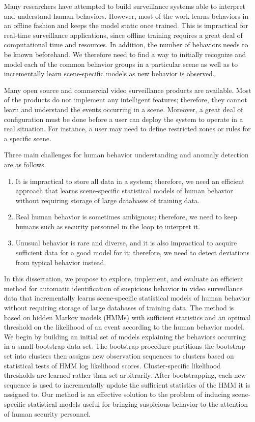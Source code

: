 Many researchers have attempted to build surveillance systems able to
interpret and understand human behaviors. However, most of the work
learns behaviors in an offline fashion and keeps the model static once
trained. This is impractical for real-time surveillance applications,
since offline training requires a great deal of computational time and
resources. In addition, the number of behaviors needs to be known
beforehand. We therefore need to find a way to initially recognize and
model each of the common behavior groups in a particular scene as well
as to incrementally learn scene-specific models as new behavior is
observed.

Many open source and commercial video surveillance products are 
available. Most of the products do not implement any intelligent
features; therefore, they cannot learn and understand the events
occurring in a scene. Moreover, a great deal of configuration must be done
before a user can deploy the system to operate in a real situation.
For instance, a user may need to define restricted zones or rules
for a specific scene.

Three main challenges for human behavior understanding and anomaly
detection are as follows.

\begin{enumerate}
    \item It is impractical to store all data in a system; therefore, we
        need an efficient approach that learns scene-specific statistical
        models of human behavior without requiring storage of large
        databases of training data.
    \item Real human behavior is sometimes ambiguous; therefore, we need to 
        keep humans such as security personnel in the loop to interpret it.
    \item Unusual behavior is rare and diverse, and it is also impractical 
        to acquire sufficient data for a good model for it; therefore, we 
        need to detect deviations from typical behavior instead.
\end{enumerate}

In this dissertation, we propose to explore, implement, and evaluate
an efficient method for automatic identification of suspicious
behavior in video surveillance data that incrementally learns
scene-specific statistical models of human behavior without requiring
storage of large databases of training data. The method is based on
hidden Markov models (HMMs) with sufficient statistics and an optimal
threshold on the likelihood of an event according to the human
behavior model.  We begin by building an initial set of models
explaining the behaviors occurring in a small bootstrap data set. The
bootstrap procedure partitions the bootstrap set into clusters then
assigns new observation sequences to clusters based on statistical
tests of HMM log likelihood scores. Cluster-specific likelihood
thresholds are learned rather than set arbitrarily. After
bootstrapping, each new sequence is used to incrementally update the
sufficient statistics of the HMM it is assigned to. Our method is an
effective solution to the problem of inducing scene-specific
statistical models useful for bringing suspicious behavior to the
attention of human security personnel.

